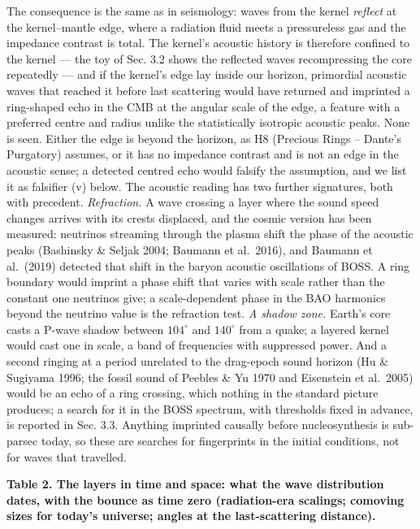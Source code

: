 \documentclass[
  11pt,
]{article}
\begin{document}
The consequence is the same as in seismology: waves from the kernel
\emph{reflect} at the kernel--mantle edge, where a radiation fluid meets
a pressureless gas and the impedance contrast is total. The kernel's
acoustic history is therefore confined to the kernel --- the toy of Sec.
3.2 shows the reflected waves recompressing the core repeatedly --- and
if the kernel's edge lay inside our horizon, primordial acoustic waves
that reached it before last scattering would have returned and imprinted
a ring-shaped echo in the CMB at the angular scale of the edge, a
feature with a preferred centre and radius unlike the statistically
isotropic acoustic peaks. None is seen. Either the edge is beyond the
horizon, as H8 (Precious Rings -- Dante's Purgatory) assumes, or it has
no impedance contrast and is not an edge in the acoustic sense; a
detected centred echo would falsify the assumption, and we list it as
falsifier (v) below. The acoustic reading has two further signatures,
both with precedent. \emph{Refraction.} A wave crossing a layer where
the sound speed changes arrives with its crests displaced, and the
cosmic version has been measured: neutrinos streaming through the plasma
shift the phase of the acoustic peaks (Bashinsky \& Seljak 2004; Baumann
et al.~2016), and Baumann et al.~(2019) detected that shift in the
baryon acoustic oscillations of BOSS. A ring boundary would imprint a
phase shift that varies with scale rather than the constant one
neutrinos give; a scale-dependent phase in the BAO harmonics beyond the
neutrino value is the refraction test. \emph{A shadow zone.} Earth's
core casts a P-wave shadow between \(104^\circ\) and \(140^\circ\) from
a quake; a layered kernel would cast one in scale, a band of frequencies
with suppressed power. And a second ringing at a period unrelated to the
drag-epoch sound horizon (Hu \& Sugiyama 1996; the fossil sound of
Peebles \& Yu 1970 and Eisenstein et al.~2005) would be an echo of a
ring crossing, which nothing in the standard picture produces; a search
for it in the BOSS spectrum, with thresholds fixed in advance, is
reported in Sec. 3.3. Anything imprinted causally before nucleosynthesis
is sub-parsec today, so these are searches for fingerprints in the
initial conditions, not for waves that travelled.

\textbf{Table 2. The layers in time and space: what the wave
distribution dates, with the bounce as time zero (radiation-era
scalings; comoving sizes for today's universe; angles at the
last-scattering distance).}
\end{document}
